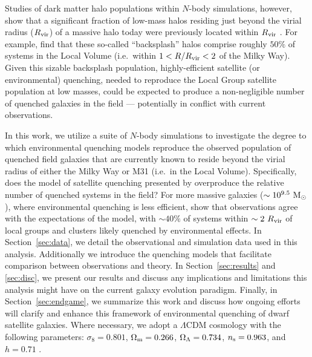 Studies of dark matter halo populations within $N$-body simulations,
however, show that a significant fraction of low-mass halos residing
just beyond the virial radius ($R_{\rm vir}$) of a massive halo today
were previously located within $R_{\rm vir}$ \citep{balogh00, mamon04,
  gill05, teyssier12, wetzel14}. 
%
For example, \citet{gk14} find that these so-called ``backsplash'' halos
comprise roughly $50\%$ of systems in the Local Volume (i.e.~within
$1 < R/R_{\rm vir} < 2$ of the Milky Way).
%
Given this sizable backsplash population, highly-efficient satellite (or
environmental) quenching, needed to reproduce the Local Group satellite
population at low masses, could be expected to produce a non-negligible
number of quenched galaxies in the field --- potentially in conflict
with current observations. 
%



In this work, we utilize a suite of $N$-body simulations to investigate the
degree to which environmental quenching models reproduce the observed
population of quenched field galaxies that are currently known to
reside beyond the virial radius of either the Milky Way or M31
(i.e.~in the Local Volume). 
%
Specifically, does the model of satellite quenching presented by
\citet{fham15, fham16} overproduce the relative number of quenched
systems in the field? 
%
For more massive galaxies ($\sim10^{9.5}~{\rm M}_{\odot}$), where environmental
quenching is less efficient, \citet{wetzel14} show that observations
agree with the expectations of the model, with $\sim40\%$
of systems within $\sim2~R_{\rm{vir}}$ of local groups and clusters likely
quenched by environmental effects.
%
In Section~\ref{sec:data}, we detail the observational and simulation
data used in this analysis. Additionally we introduce the quenching
models that facilitate comparison between observations and theory.
%
In Section~\ref{sec:results} and \ref{sec:disc}, we present our
results and discuss any implications and limitations this analysis
might have on the current galaxy evolution paradigm.
%
Finally, in Section~\ref{sec:endgame}, we summarize this work and
discuss how ongoing efforts will clarify and enhance this framework of
environmental quenching of dwarf satellite galaxies.
%
Where necessary, we adopt a $\Lambda$CDM cosmology with the following
parameters: $\sigma_{8}=0.801$, $\Omega_{\rm m}=0.266$,
$\Omega_{\rm \Lambda}=0.734$, $n_{\rm s}=0.963$, and
$h=0.71$ \citep[WMAP7,][]{larson11}. 




